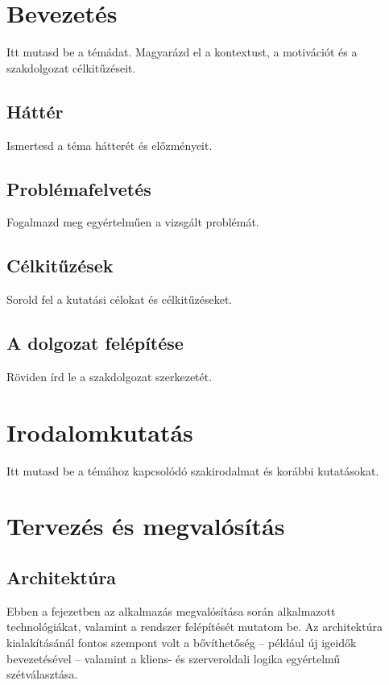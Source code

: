 \documentclass[12pt,a4paper]{report}
\begin{document}
\listoftables
\newpage

\chapter{Bevezetés}
\label{ch:bevezetes}

Itt mutasd be a témádat. Magyarázd el a kontextust, a motivációt és a szakdolgozat célkitűzéseit.

\section{Háttér}
Ismertesd a téma hátterét és előzményeit.

\section{Problémafelvetés}
Fogalmazd meg egyértelműen a vizsgált problémát.

\section{Célkitűzések}
Sorold fel a kutatási célokat és célkitűzéseket.

\section{A dolgozat felépítése}
Röviden írd le a szakdolgozat szerkezetét.

\chapter{Irodalomkutatás}
\label{ch:irodalomkutatas}

Itt mutasd be a témához kapcsolódó szakirodalmat és korábbi kutatásokat.

\chapter{Tervezés és megvalósítás}
\label{ch:tervezes}

\section{Architektúra}

Ebben a fejezetben az alkalmazás megvalósítása során alkalmazott technológiákat, valamint a rendszer felépítését mutatom be. Az architektúra kialakításánál fontos szempont volt a bővíthetőség -- például új igeidők bevezetésével -- valamint a kliens- és szerveroldali logika egyértelmű szétválasztása.
\end{document}
